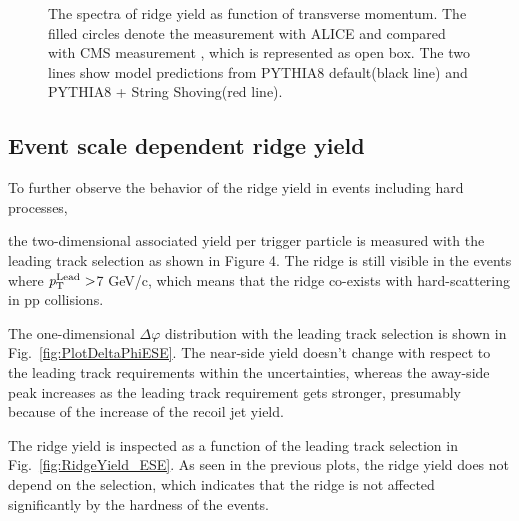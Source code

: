\begin{figure}[h!]
	\centering
	\caption{ The spectra of ridge yield as function of transverse momentum. The filled circles denote the measurement with ALICE and compared with CMS measurement \cite{ridge_pp_1}, which is represented as open box. The two lines show model predictions from PYTHIA8 default(black line) and PYTHIA8 + String Shoving(red line).  }
	\label{fig:PlotYSpect}
\end{figure}

\subsection{Event scale dependent ridge yield}

To further observe the behavior of the ridge yield in events including hard processes, 

the two-dimensional associated yield per trigger particle is measured with the leading track selection as shown in Figure 4. The ridge is still visible in the events where $\it{p}_{\rm{T}}^{\rm{Lead}}>$7 GeV/c, which means that the ridge co-exists with hard-scattering in pp collisions. 

The one-dimensional $\Delta\varphi$ distribution with the leading track selection is shown in Fig.~\ref{fig:PlotDeltaPhiESE}. The near-side yield doesn't change with respect to the leading track requirements within the uncertainties, whereas the away-side peak increases as the leading track requirement gets stronger, presumably because of the increase of the recoil jet yield.

The ridge yield is inspected as a function of the leading track selection in Fig.~\ref{fig:RidgeYield_ESE}. As seen in the previous plots, the ridge yield does not depend on the selection, which indicates that the ridge is not affected significantly by the hardness of the events.


